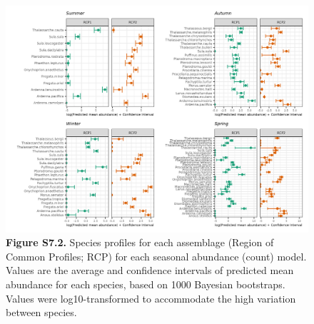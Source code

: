 \documentclass[
]{article}
\begin{document}
\begin{landscape}
\newpage

\begin{figure}
\centering
\includegraphics{../results/FigS7_2_spp-profiles-NegBin.png}
\caption{\textbf{Figure S7.2.} Species profiles for each assemblage
(Region of Common Profiles; RCP) for each seasonal abundance (count)
model. Values are the average and confidence intervals of predicted mean
abundance for each species, based on 1000 Bayesian bootstraps. Values
were log10-transformed to accommodate the high variation between
species.}
\end{figure}

\end{landscape}

\newpage
\end{document}
